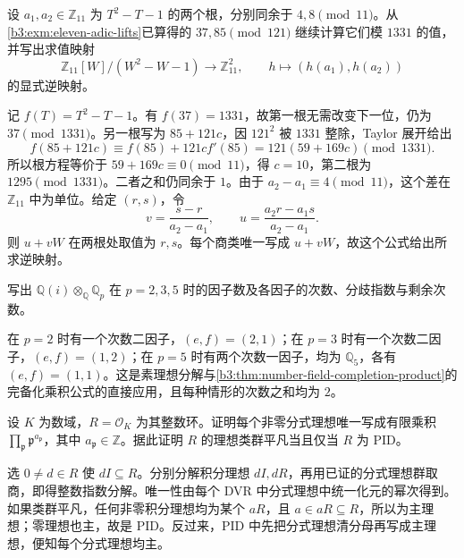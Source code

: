 \begin{optionalexercise}\label{b3:ex:A-eleven-adic-lifts}
	设 \(a_1,a_2\in\mathbb Z_{11}\) 为 \(T^2-T-1\) 的两个根，分别同余于 \(4,8\pmod{11}\)。从\cref{b3:exm:eleven-adic-lifts}已算得的 \(37,85\pmod{121}\) 继续计算它们模 \(1331\) 的值，并写出求值映射
	\[
		\mathbb Z_{11}[W]/(W^2-W-1)\longrightarrow\mathbb Z_{11}^2, \qquad h\longmapsto(h(a_1),h(a_2))
	\]
	的显式逆映射。
\end{optionalexercise}
\begin{solution}
	记 \(f(T)=T^2-T-1\)。有 \(f(37)=1331\)，故第一根无需改变下一位，仍为 \(37\pmod{1331}\)。另一根写为 \(85+121c\)，因 \(121^2\) 被 \(1331\) 整除，Taylor 展开给出
	\[
		f(85+121c)\equiv f(85)+121c f'(85) =121(59+169c)\pmod{1331}.
	\]
	所以根方程等价于 \(59+169c\equiv0\pmod{11}\)，得 \(c=10\)，第二根为 \(1295\pmod{1331}\)。二者之和仍同余于 \(1\)。由于 \(a_2-a_1\equiv4\pmod{11}\)，这个差在 \(\mathbb Z_{11}\) 中为单位。给定 \((r,s)\)，令
	\[
		v=\dfrac{s-r}{a_2-a_1},\qquad u=\dfrac{a_2r-a_1s}{a_2-a_1}.
	\]
	则 \(u+vW\) 在两根处取值为 \(r,s\)。每个商类唯一写成 \(u+vW\)，故这个公式给出所求逆映射。
\end{solution}

\begin{exercise}\label{b3:ex:A-local-product}
	写出 \(\mathbb Q(i)\otimes_{\mathbb Q}\mathbb Q_p\) 在 \(p=2,3,5\) 时的因子数及各因子的次数、分歧指数与剩余次数。
\end{exercise}
\begin{solution}
	在 \(p=2\) 时有一个次数二因子，\((e,f)=(2,1)\)；在 \(p=3\) 时有一个次数二因子，\((e,f)=(1,2)\)；在 \(p=5\) 时有两个次数一因子，均为 \(\mathbb Q_5\)，各有 \((e,f)=(1,1)\)。这是素理想分解与\cref{b3:thm:number-field-completion-product}的完备化乘积公式的直接应用，且每种情形的次数之和均为 \(2\)。
\end{solution}

\begin{exercise}\label{b3:ex:A-fractional-valuations}
	设 \(K\) 为数域，\(R=\mathcal O_K\) 为其整数环。证明每个非零分式理想唯一写成有限乘积 \(\prod_{\mathfrak p}\mathfrak p^{a_{\mathfrak p}}\)，其中 \(a_{\mathfrak p}\in\mathbb Z\)。据此证明 \(R\) 的理想类群平凡当且仅当 \(R\) 为 PID。
\end{exercise}
\begin{solution}
	选 \(0\ne d\in R\) 使 \(dI\subseteq R\)。分别分解积分理想 \(dI,dR\)，再用已证的分式理想群取商，即得整数指数分解。唯一性由每个 DVR 中分式理想中统一化元的幂次得到。如果类群平凡，任何非零积分理想均为某个 \(aR\)，且 \(a\in aR\subseteq R\)，所以为主理想；零理想也主，故是 PID。反过来，PID 中先把分式理想清分母再写成主理想，便知每个分式理想均主。
\end{solution}

